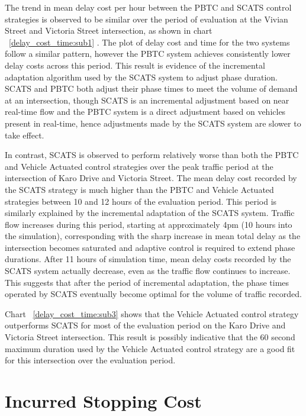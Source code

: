 {The trend in mean delay cost per hour between the PBTC and SCATS control strategies is observed to be similar over the period of evaluation at the Vivian Street and Victoria Street intersection, as shown in chart ~\ref{delay_cost_time:sub1} . The plot of delay cost and time for the two systems follow a similar pattern, however the PBTC system achieves consistently lower delay costs across this period. This result is evidence of the incremental adaptation algorithm used by the SCATS system to adjust phase duration. SCATS and PBTC both adjust their phase times to meet the volume of demand at an intersection, though SCATS is an incremental adjustment based on near real-time flow and the PBTC system is a direct adjustment based on vehicles present in real-time, hence adjustments made by the SCATS system are slower to take effect.

In contrast, SCATS is observed to perform relatively worse than both the PBTC and Vehicle Actuated control strategies over the peak traffic period at the intersection of Karo Drive and Victoria Street. The mean delay cost recorded by the SCATS strategy is much higher than the PBTC and Vehicle Actuated strategies between 10 and 12 hours of the evaluation period. This period is similarly explained by the incremental adaptation of the SCATS system. Traffic flow increases during this period, starting at approximately 4pm (10 hours into the simulation), corresponding with the sharp increase in mean total delay as the intersection becomes saturated and adaptive control is required to extend phase durations. After 11 hours of simulation time, mean delay costs recorded by the SCATS system actually decrease, even as the traffic flow continues to increase. This suggests that after the period of incremental adaptation, the phase times operated by SCATS eventually become optimal for the volume of traffic recorded. 

Chart ~\ref{delay_cost_time:sub3} shows that the Vehicle Actuated control strategy outperforms SCATS for most of the evaluation period on the Karo Drive and Victoria Street intersection. This result is possibly indicative that the 60 second maximum duration used by the Vehicle Actuated control strategy are a good fit for this intersection over the evaluation period.

\section{Incurred Stopping Cost}
\label{sec:incurred_stopping_cost}

}
